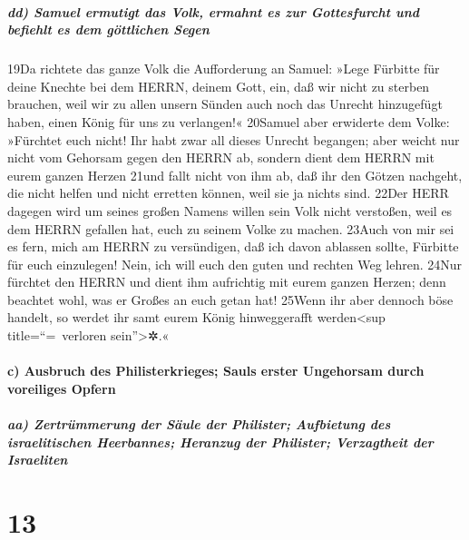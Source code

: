 \hypertarget{dd-samuel-ermutigt-das-volk-ermahnt-es-zur-gottesfurcht-und-befiehlt-es-dem-guxf6ttlichen-segen}{%
\subparagraph{dd) Samuel ermutigt das Volk, ermahnt es zur Gottesfurcht
und befiehlt es dem göttlichen
Segen}\label{dd-samuel-ermutigt-das-volk-ermahnt-es-zur-gottesfurcht-und-befiehlt-es-dem-guxf6ttlichen-segen}}

19Da richtete das ganze Volk die Aufforderung an Samuel: »Lege Fürbitte
für deine Knechte bei dem HERRN, deinem Gott, ein, daß wir nicht zu
sterben brauchen, weil wir zu allen unsern Sünden auch noch das Unrecht
hinzugefügt haben, einen König für uns zu verlangen!« 20Samuel aber
erwiderte dem Volke: »Fürchtet euch nicht! Ihr habt zwar all dieses
Unrecht begangen; aber weicht nur nicht vom Gehorsam gegen den HERRN ab,
sondern dient dem HERRN mit eurem ganzen Herzen 21und fallt nicht von
ihm ab, daß ihr den Götzen nachgeht, die nicht helfen und nicht erretten
können, weil sie ja nichts sind. 22Der HERR dagegen wird um seines
großen Namens willen sein Volk nicht verstoßen, weil es dem HERRN
gefallen hat, euch zu seinem Volke zu machen. 23Auch von mir sei es
fern, mich am HERRN zu versündigen, daß ich davon ablassen sollte,
Fürbitte für euch einzulegen! Nein, ich will euch den guten und rechten
Weg lehren. 24Nur fürchtet den HERRN und dient ihm aufrichtig mit eurem
ganzen Herzen; denn beachtet wohl, was er Großes an euch getan hat!
25Wenn ihr aber dennoch böse handelt, so werdet ihr samt eurem König
hinweggerafft werden\textless sup title=``=~verloren
sein''\textgreater✲.«

\hypertarget{c-ausbruch-des-philisterkrieges-sauls-erster-ungehorsam-durch-voreiliges-opfern}{%
\paragraph{c) Ausbruch des Philisterkrieges; Sauls erster Ungehorsam
durch voreiliges
Opfern}\label{c-ausbruch-des-philisterkrieges-sauls-erster-ungehorsam-durch-voreiliges-opfern}}

\hypertarget{aa-zertruxfcmmerung-der-suxe4ule-der-philister-aufbietung-des-israelitischen-heerbannes-heranzug-der-philister-verzagtheit-der-israeliten}{%
\subparagraph{aa) Zertrümmerung der Säule der Philister; Aufbietung des
israelitischen Heerbannes; Heranzug der Philister; Verzagtheit der
Israeliten}\label{aa-zertruxfcmmerung-der-suxe4ule-der-philister-aufbietung-des-israelitischen-heerbannes-heranzug-der-philister-verzagtheit-der-israeliten}}

\hypertarget{section-12}{%
\section{13}\label{section-12}}

